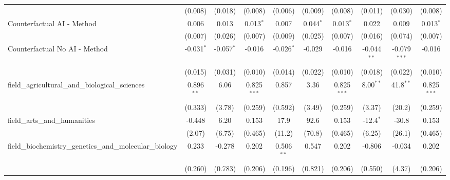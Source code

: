 \begin{tabular}{lccccccccc}
                                                               & (0.008)        & (0.018)        & (0.008)        & (0.006)        & (0.009)       & (0.008)        & (0.011)        & (0.030)        & (0.008)\\   
   Counterfactual AI - Method                                  & 0.006          & 0.013          & 0.013$^{*}$    & 0.007          & 0.044$^{*}$   & 0.013$^{*}$    & 0.022          & 0.009          & 0.013$^{*}$\\   
                                                               & (0.007)        & (0.026)        & (0.007)        & (0.009)        & (0.025)       & (0.007)        & (0.016)        & (0.074)        & (0.007)\\   
   Counterfactual No AI - Method                               & -0.031$^{*}$   & -0.057$^{*}$   & -0.016         & -0.026$^{*}$   & -0.029        & -0.016         & -0.044$^{**}$  & -0.079$^{***}$ & -0.016\\   
                                                               & (0.015)        & (0.031)        & (0.010)        & (0.014)        & (0.022)       & (0.010)        & (0.018)        & (0.022)        & (0.010)\\   
   field\_agricultural\_and\_biological\_sciences              & 0.896$^{**}$   & 6.06           & 0.825$^{***}$  & 0.857          & 3.36          & 0.825$^{***}$  & 8.00$^{**}$    & 41.8$^{**}$    & 0.825$^{***}$\\   
                                                               & (0.333)        & (3.78)         & (0.259)        & (0.592)        & (3.49)        & (0.259)        & (3.37)         & (20.2)         & (0.259)\\   
   field\_arts\_and\_humanities                                & -0.448         & 6.20           & 0.153          & 17.9           & 92.6          & 0.153          & -12.4$^{*}$    & -30.8          & 0.153\\   
                                                               & (2.07)         & (6.75)         & (0.465)        & (11.2)         & (70.8)        & (0.465)        & (6.25)         & (26.1)         & (0.465)\\   
   field\_biochemistry\_genetics\_and\_molecular\_biology      & 0.233          & -0.278         & 0.202          & 0.506$^{**}$   & 0.547         & 0.202          & -0.806         & -0.034         & 0.202\\   
                                                               & (0.260)        & (0.783)        & (0.206)        & (0.196)        & (0.821)       & (0.206)        & (0.550)        & (4.37)         & (0.206)\\   

\end{tabular}
